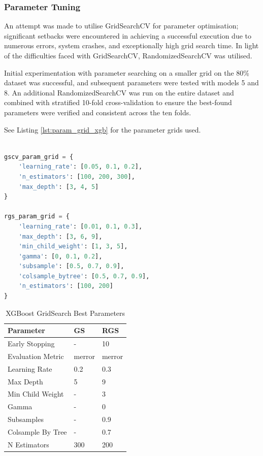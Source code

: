 \subsubsection*{Parameter Tuning}

An attempt was made to utilise GridSearchCV for parameter optimisation; significant setbacks were encountered in achieving a successful execution due to numerous errors, system crashes, and exceptionally high grid search time. In light of the difficulties faced with GridSearchCV, RandomizedSearchCV was utilised. 

Initial experimentation with parameter searching on a smaller grid on the 80\% dataset was successful, and subsequent parameters were tested with models 5 and 8. An additional RandomizedSearchCV was run on the entire dataset and combined with stratified 10-fold cross-validation to ensure the best-found parameters were verified and consistent across the ten folds.

See Listing \ref{lst:param_grid_xgb} for the parameter grids used.

\medskip
	
\begin{lstlisting}[language=Python, caption={Grid Search Parameters For XGBoost}, label= lst:param_grid_xgb]

gscv_param_grid = {
    'learning_rate': [0.05, 0.1, 0.2],
    'n_estimators': [100, 200, 300],
    'max_depth': [3, 4, 5]
}

rgs_param_grid = {
    'learning_rate': [0.01, 0.1, 0.3],
    'max_depth': [3, 6, 9],
    'min_child_weight': [1, 3, 5],
    'gamma': [0, 0.1, 0.2],
    'subsample': [0.5, 0.7, 0.9],
    'colsample_bytree': [0.5, 0.7, 0.9],
    'n_estimators': [100, 200]
}
\end{lstlisting}

\begin{table}[H]
\captionsetup{justification=centering} 
\centering
\caption{XGBoost GridSearch Best Parameters}
\begin{tabular}{lll}
\hline
\textbf{Parameter} & \textbf{GS} & \textbf{RGS} \\ \hline
Early Stopping & - & 10 \\
Evaluation Metric & merror & merror \\
Learning Rate & 0.2 & 0.3 \\
Max Depth & 5 & 9 \\
Min Child Weight & - & 3 \\
Gamma & - & 0 \\
Subsamples & - & 0.9 \\
Colsample By Tree & - & 0.7 \\
N Estimators & 300 &  200 \\ \hline
\end{tabular}
\label{tab:xg_gs_parameters}
\end{table}

